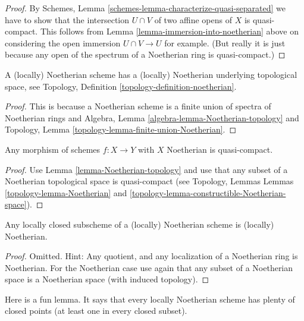 \begin{proof}
By Schemes, Lemma \ref{schemes-lemma-characterize-quasi-separated}
we have to show that the intersection $U \cap V$ of two
affine opens of $X$ is quasi-compact. This follows from
Lemma \ref{lemma-immersion-into-noetherian} above on
considering the open immersion $U \cap V \to U$ for example.
(But really it is just because any open of the spectrum of a
Noetherian ring is quasi-compact.)
\end{proof}

\begin{lemma}
\label{lemma-Noetherian-topology}
A (locally) Noetherian scheme has a (locally)
Noetherian underlying topological space,
see Topology, Definition \ref{topology-definition-noetherian}.
\end{lemma}

\begin{proof}
This is because a Noetherian scheme is a finite union of spectra
of Noetherian rings and
Algebra, Lemma \ref{algebra-lemma-Noetherian-topology} and
Topology, Lemma \ref{topology-lemma-finite-union-Noetherian}.
\end{proof}

\begin{lemma}
\label{lemma-morphism-Noetherian-schemes-quasi-compact}
Any morphism of schemes $f : X \to Y$ with $X$ Noetherian
is quasi-compact.
\end{lemma}

\begin{proof}
Use Lemma \ref{lemma-Noetherian-topology}
and use that any subset of a Noetherian topological
space is quasi-compact (see Topology, Lemmas
Lemmas \ref{topology-lemma-Noetherian} and
\ref{topology-lemma-constructible-Noetherian-space}).
\end{proof}

\begin{lemma}
\label{lemma-locally-closed-in-Noetherian}
Any locally closed subscheme of a (locally) Noetherian
scheme is (locally) Noetherian.
\end{lemma}

\begin{proof}
Omitted. Hint: Any quotient, and any localization of a Noetherian 
ring is Noetherian. For the Noetherian case use again
that any subset of a Noetherian space is a Noetherian space
(with induced topology).
\end{proof}

\noindent
Here is a fun lemma.
It says that every locally Noetherian scheme has plenty of
closed points (at least one in every closed subset).

